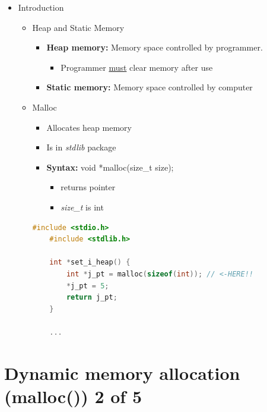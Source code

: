 \documentclass[12pt]{article}
\begin{document}
\begin{itemize}
    \item Introduction
    \begin{itemize}
        \item Heap and Static Memory
            \begin{itemize}
            \item \textbf{Heap memory:} Memory space controlled by programmer.
            \begin{itemize}
                \item Programmer \underline{must} clear memory after use
            \end{itemize}
            \item \textbf{Static memory:} Memory space controlled by computer
        \end{itemize}

        \item Malloc
        \begin{itemize}
            \item Allocates heap memory
            \item Is in \textit{stdlib} package
            \item \textbf{Syntax:} void *malloc(size\_t size);
            \begin{itemize}
                \item returns pointer
                \item \textit{size\_t} is int
            \end{itemize}
        \end{itemize}

    \begin{lstlisting}[language=c,caption={dynamic\_mem\_example\_1.c}]
    #include <stdio.h>
    #include <stdlib.h>

    int *set_i_heap() {
        int *j_pt = malloc(sizeof(int)); // <-HERE!!
        *j_pt = 5;
        return j_pt;
    }

    ...

    \end{lstlisting}
    \end{itemize}
\end{itemize}

\bigskip

\section*{Dynamic memory allocation (malloc()) 2 of 5}
\end{document}
